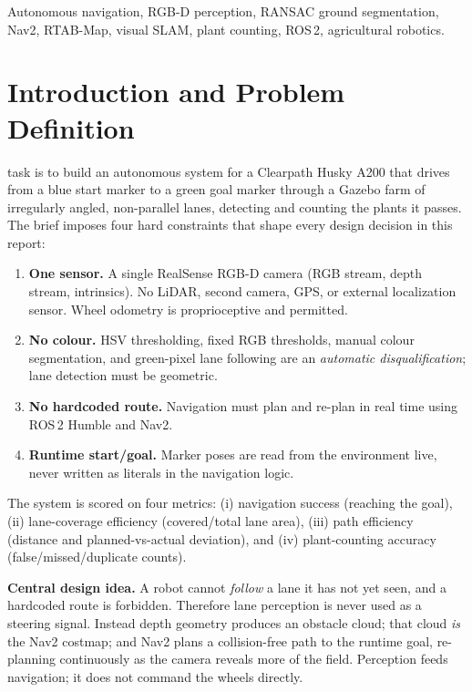 \documentclass[10pt,journal,twoside]{IEEEtran}
\begin{document}
\begin{IEEEkeywords}
Autonomous navigation, RGB-D perception, RANSAC ground segmentation, Nav2, RTAB-Map, visual SLAM, plant counting, ROS\,2, agricultural robotics.
\end{IEEEkeywords}

\section{Introduction and Problem Definition}
 task is to build an autonomous system for a Clearpath Husky A200 that drives from a blue start marker to a green goal marker through a Gazebo farm of irregularly angled, non-parallel lanes, detecting and counting the plants it passes. The brief imposes four hard constraints that shape every design decision in this report:

\begin{enumerate}
\item \textbf{One sensor.} A single RealSense RGB-D camera (RGB stream, depth stream, intrinsics). No LiDAR, second camera, GPS, or external localization sensor. Wheel odometry is proprioceptive and permitted.
\item \textbf{No colour.} HSV thresholding, fixed RGB thresholds, manual colour segmentation, and green-pixel lane following are an \emph{automatic disqualification}; lane detection must be geometric.
\item \textbf{No hardcoded route.} Navigation must plan and re-plan in real time using ROS\,2 Humble and Nav2.
\item \textbf{Runtime start/goal.} Marker poses are read from the environment live, never written as literals in the navigation logic.
\end{enumerate}

\noindent The system is scored on four metrics: (i) navigation success (reaching the goal), (ii) lane-coverage efficiency (covered/total lane area), (iii) path efficiency (distance and planned-vs-actual deviation), and (iv) plant-counting accuracy (false/missed/duplicate counts).

\textbf{Central design idea.} A robot cannot \emph{follow} a lane it has not yet seen, and a hardcoded route is forbidden. Therefore lane perception is never used as a steering signal. Instead depth geometry produces an obstacle cloud; that cloud \emph{is} the Nav2 costmap; and Nav2 plans a collision-free path to the runtime goal, re-planning continuously as the camera reveals more of the field. Perception feeds navigation; it does not command the wheels directly.
\end{document}
